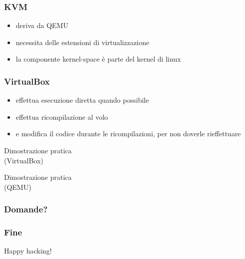 \documentclass[ignorenonframetext]{beamer}
\begin{document}
  \begin{frame}
  \frametitle{KVM}
  \begin{itemize}
  \item deriva da QEMU
  \item necessita delle estensioni di virtualizzazione
  \item la componente kernel-space è parte del kernel di linux
  \end{itemize}
  \end{frame}
  
  \begin{frame}
  \frametitle{VirtualBox}
  \begin{itemize}
  \item effettua esecuzione diretta quando possibile
  \item effettua ricompilazione al volo
  \item e modifica il codice durante le ricompilazioni, per non doverle
  rieffettuare
  \end{itemize}
  \end{frame}
  
  \begin{frame}
  \Huge Dimostrazione pratica\\
  (VirtualBox)
  \end{frame}

  \begin{frame}
  \Huge Dimostrazione pratica\\
  (QEMU)  
  \end{frame}

  \begin{frame}
  \frametitle{Domande?}
  
  \end{frame}

  \begin{frame}
  \frametitle{Fine}
  Happy hacking!
  \end{frame}
\end{document}
